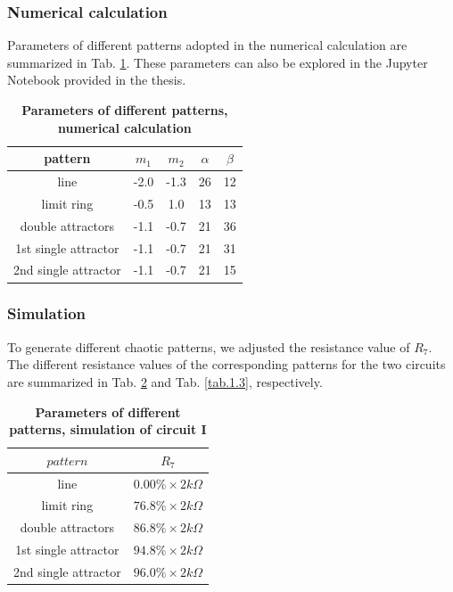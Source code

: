 \documentclass[12pt,a4paper,UTF8]{article}
\begin{document}
        \subsubsection{Numerical calculation}
        Parameters of different patterns adopted in the numerical calculation are summarized in Tab. \ref{tab.1.1}.
        These parameters can also be explored in the Jupyter Notebook provided in the thesis.
            \begin{table}[htbp]
                \centering
                \caption{\textbf{Parameters of different patterns, numerical calculation}}
                \label{tab.1.1}
                    \begin{tabular}{ccccc}
                        \toprule
                        pattern	&$m_1$	&$m_2$	&$\alpha$	&$\beta$ \\
                        \midrule
                        line	&-2.0	&-1.3	&26	&12	\\
                        limit ring	&-0.5	&1.0	&13	&13	\\
                        double attractors	&-1.1	&-0.7	&21	&36	\\
                        1st single attractor	&-1.1	&-0.7	&21	&31	\\
                        2nd single attractor	&-1.1	&-0.7	&21	&15	\\
                        \bottomrule
                    \end{tabular}
            \end{table}

        \subsubsection{Simulation}
        To generate different chaotic patterns, we adjusted the resistance value of $R_7$.
        The different resistance values of the corresponding patterns for the two circuits are summarized in Tab. \ref{tab.1.2} and Tab. \ref{tab.1.3}, respectively.
            \begin{table}[htbp]
                \centering
                \caption{\textbf{Parameters of different patterns, simulation of circuit I}}
                \label{tab.1.2}
                    \begin{tabular}{cc}
                        \toprule
                        $pattern$	&$R_7$ \\
                        \midrule
                        line	&$ 0.00\% \times 2k\Omega$	\\
                        limit ring	&$ 76.8\% \times 2k\Omega$	\\
                        double attractors	&$ 86.8\% \times 2k\Omega$	\\
                        1st single attractor	&$ 94.8\% \times 2k\Omega$	\\
                        2nd single attractor	&$ 96.0\% \times 2k\Omega$	\\
                        \bottomrule
                    \end{tabular}
            \end{table}
            
\end{document}
